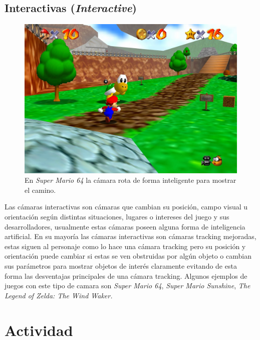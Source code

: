 \subsection{Interactivas (\emph{Interactive})}
\begin{figure}
\includegraphics[width=\linewidth]{semana2/supermario64.jpg} 
\caption{En \emph{Super Mario 64} la cámara rota de forma inteligente para mostrar el camino.}
\end{figure}
Las cámaras interactivas son cámaras que cambian su posición, campo visual u orientación según distintas situaciones, lugares o intereses del juego y sus desarrolladores, usualmente estas cámaras poseen alguna forma de inteligencia artificial. En su mayoría las cámaras interactivas son cámaras tracking mejoradas, estas siguen al personaje como lo hace una cámara tracking pero su posición y orientación puede cambiar si estas se ven obstruidas por algún objeto o cambian sus parámetros para mostrar objetos de interés claramente evitando de esta forma las desventajas principales de una cámara tracking. Algunos ejemplos de juegos con este tipo de camara son \emph{Super Mario 64}, \emph{Super Mario Sunshine}, \emph{The Legend of Zelda: The Wind Waker.}
\section{Actividad}
